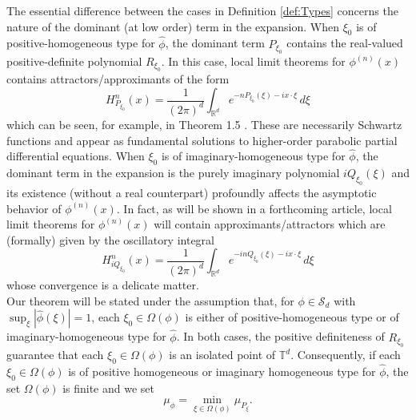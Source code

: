 \documentclass[11pt]{article}
\theoremstyle{remark}
\begin{document}
\noindent The essential difference between the cases in Definition \ref{def:Types} 
concerns the nature of the dominant (at low order) term in the expansion. When $\xi_0$ is of positive-homogeneous type for $\widehat{\phi}$, the dominant term $P_{\xi_0}$ contains the real-valued positive-definite polynomial $R_{\xi_0}$. In this case, local limit theorems for $\phi^{(n)}(x)$ contains attractors/approximants of the form
\begin{equation*}
    H^n_{P_{\xi_0}}(x)=\frac{1}{(2\pi)^d}\int_{\mathbb{R}^d}e^{-nP_{\xi_0}(\xi)-ix\cdot\xi}\,d\xi
\end{equation*}
which can be seen, for example, in Theorem 1.5 \cite{Randles2017}. These are necessarily Schwartz functions and appear as fundamental solutions to higher-order parabolic partial differential equations. When $\xi_0$ is of imaginary-homogeneous type for $\widehat{\phi}$, the dominant term in the expansion is the purely imaginary polynomial $iQ_{\xi_0}(\xi)$ and its existence (without a real counterpart) profoundly affects the asymptotic behavior of $\phi^{(n)}(x)$. In fact, as will be shown in a forthcoming article, local limit theorems for $\phi^{(n)}(x)$ will contain approximants/attractors which are (formally) given by the oscillatory integral
\begin{equation*}
    H_{iQ_{\xi_0}}^{n}(x)=\frac{1}{(2\pi)^d}\int_{\mathbb{R}^d}e^{-inQ_{\xi_0}(\xi)-ix\cdot \xi}\,d\xi
\end{equation*}
whose convergence is a delicate matter.  \\






\noindent Our theorem will be stated under the assumption that, for $\phi\in\mathcal{S}_d$ with $\sup_\xi|\widehat{\phi}(\xi)|=1$, each $\xi_0\in\Omega(\phi)$ is either of positive-homogeneous type or of imaginary-homogeneous type for $\widehat{\phi}$. In both cases, the positive definiteness of $R_{\xi_0}$ guarantee that each $\xi_0\in\Omega(\phi)$ is an isolated point of $\mathbb{T}^d$. Consequently, if each $\xi_0\in\Omega(\phi)$ is of positive homogeneous or imaginary homogeneous type for $\widehat{\phi}$, the set $\Omega(\phi)$ is finite and we set
\begin{equation*}
    \mu_{\phi}=\min_{\xi\in\Omega(\phi)}\mu_{P_\xi}.
\end{equation*}
\end{document}
